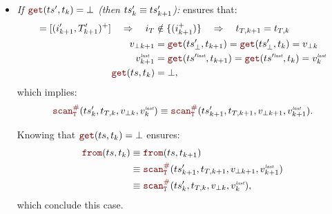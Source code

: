 \begin{skippableproof}
\begin{itemize}
\begin{itemize}
                        Knowing that $\getAt{\ts}{t_k} = \bot$ ensures:
                        \begin{align*}
                            \from{\ts}{t_k} & \equiv \from{\ts}{t_{k+1}}                                                 \\
                                            & \equiv \scanAux{\ts'_{k+1}}{T}{t_{T, k+1}}{v_{\bot k+1}}{v^\explast_{k+1}} \\
                                            & \equiv \scanAux{\ts'_k}{T}{t_{T, k}}{v_{\bot k}}{v^\explast_k},
                        \end{align*}
                        which conclude this case.

                  \item \textit{If $\getAt{\ts'}{t_k} = \bot$ (then $ts'_k \equiv ts'_{k+1}$):}
                         ensures that:
                        \begin{align*}
                            [(i_{k+1}, T_{k+1})^+] = [(i'_{k+1}, T'_{k+1})^+] \quad \Rightarrow
                            \quad i_T        & \notin \{(i_{k+1}^+)\} \quad \Rightarrow \quad
                            t_{T, k+1} = t_{T, k}                                                                                         \\
                            v_{\bot k+1}     & = \getAt{\ts'_\bot}{t_{k+1}} = \getAt{\ts'_\bot}{t_k} = v_{\bot k}                         \\
                            v^\explast_{k+1} & = \getAt{\ts^{\prime\explast}}{t_{k+1}} = \getAt{\ts^{\prime\explast}}{t_k} = v^\explast_k \\
                            \getAt{\ts}{t_k} & = \bot,
                        \end{align*}
                        which implies:
                        \begin{equation*}
                            \scanAux{\ts'_k}{T}{t_{T, k}}{v_{\bot k}}{v^\explast_k} \equiv
                            \scanAux{\ts'_{k+1}}{T}{t_{T, k+1}}{v_{\bot k+1}}{v^\explast_{k+1}}.
                        \end{equation*}

                        Knowing that $\getAt{\ts}{t_k} = \bot$ ensures:
                        \begin{align*}
                            \from{\ts}{t_k} & \equiv \from{\ts}{t_{k+1}}                                                 \\
                                            & \equiv \scanAux{\ts'_{k+1}}{T}{t_{T, k+1}}{v_{\bot k+1}}{v^\explast_{k+1}} \\
                                            & \equiv \scanAux{\ts'_k}{T}{t_{T, k}}{v_{\bot k}}{v^\explast_k},
                        \end{align*}
                        which conclude this case.
              \end{itemize}


\end{itemize}
\end{skippableproof}
